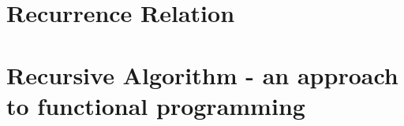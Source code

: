 \chapter{Recurrence Relation }

\chapter{Recursive Algorithm - an approach to functional programming}

